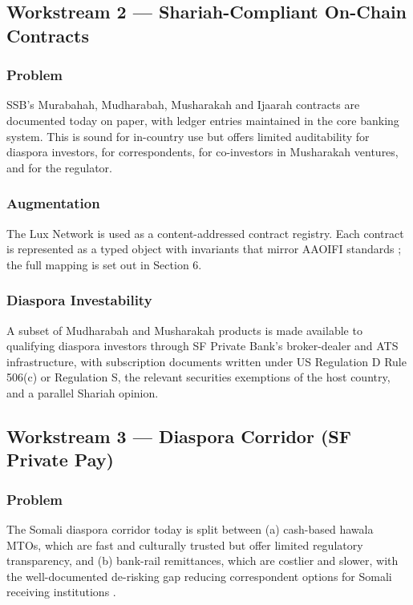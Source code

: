 \documentclass[11pt,letterpaper]{article}
\begin{document}
\subsection{Workstream 2 --- Shariah-Compliant On-Chain Contracts}

\subsubsection{Problem}
SSB's Murabahah, Mudharabah, Musharakah and Ijaarah contracts are
documented today on paper, with ledger entries maintained in the core
banking system. This is sound for in-country use but offers limited
auditability for diaspora investors, for correspondents, for
co-investors in Musharakah ventures, and for the regulator.

\subsubsection{Augmentation}
The Lux Network is used as a content-addressed contract registry. Each
contract is represented as a typed object with invariants that mirror
AAOIFI standards \cite{aaoifi_standards}; the full mapping is set out
in Section 6.

\subsubsection{Diaspora Investability}
A subset of Mudharabah and Musharakah products is made available to
qualifying diaspora investors through SF Private Bank's broker-dealer
and ATS infrastructure, with subscription documents written under US
Regulation D Rule 506(c) or Regulation S, the relevant securities
exemptions of the host country, and a parallel Shariah opinion.

\subsection{Workstream 3 --- Diaspora Corridor (SF Private Pay)}

\subsubsection{Problem}
The Somali diaspora corridor today is split between (a) cash-based
hawala MTOs, which are fast and culturally trusted but offer limited
regulatory transparency, and (b) bank-rail remittances, which are
costlier and slower, with the well-documented de-risking gap reducing
correspondent options for Somali receiving institutions
\cite{fsb_derisking}.
\end{document}

